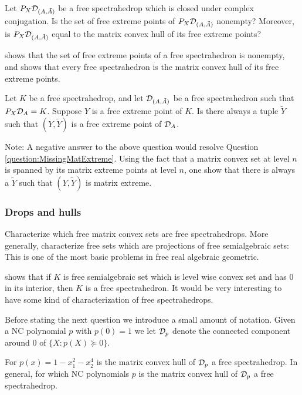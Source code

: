 \begin{question}
Let $P_X \mathcal{D}_{(A,\tilde{A})}$ be a free spectrahedrop which is closed under complex conjugation. Is the set of free extreme points of $P_X 
\mathcal{D}_{(A,\tilde{A})}$ nonempty? Moreover, is $P_X \mathcal{D}_{(A,\tilde{A})}$ equal to the matrix convex hull of its free extreme points?
\end{question}

\cite{EHKM18} shows that the set of free extreme points of a free spectrahedron is nonempty, and \cite{EH19} shows that every free 
spectrahedron is the matrix convex hull of its free extreme points. 

\begin{question}
Let $K$ be a free spectrahedrop, and let $\mathcal{D}_{(A,\tilde{A})}$ be a free spectrahedron such that $P_X \mathcal{D}_A = K$. Suppose $Y$ is a free 
extreme point of $K$. Is there always a tuple $\tilde{Y}$ such that $(Y,\tilde{Y})$ is a free extreme point of $\mathcal{D}_A$. 
\end{question}

Note: A negative answer to the above question would resolve Question \ref{question:MissingMatExtreme}. Using the fact that a matrix convex 
set at level $n$ is spanned by its matrix extreme points at level $n$, one show that there is always a $\tilde{Y}$ such that $(Y,\tilde{Y})$ 
is matrix extreme.

\subsubsection{Drops and hulls}

\begin{question}
Characterize which free matrix convex sets are free spectrahedrops. More generally, characterize free sets which are projections of free 
semialgebraic sets: This is one of the most basic problems in free real algebraic geometric.
\end{question}

\cite{HM12} shows that if $K$ is free semialgebraic set which is level wise convex set and has $0$ in its interior, then $K$ is a free 
spectrahedron. It would be very interesting to have some kind of characterization of free spectrahedrops. 

Before stating the next question we introduce a small amount of notation. Given a NC polynomial $p$ with $p(0)=1$ we let $\mathcal{D}_p$ denote the 
connected component around $0$ of $\{X : p (X) \succeq 0\}$. 

\begin{question}
For $p(x) = 1-x_1^2-x_2^4$ is the matrix convex hull of $\mathcal{D}_p$ a free spectrahedrop. In general, for which NC polynomials $p$ is the matrix 
convex hull of $\mathcal{D}_p$ a free spectrahedrop. 
\end{question}

